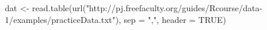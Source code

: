 \begin{Schunk}
\begin{Sinput}
  dat <- read.table(url("http://pj.freefaculty.org/guides/Rcourse/data-1/examples/practiceData.txt"), sep = ",", header = TRUE)
\end{Sinput}
\end{Schunk}

